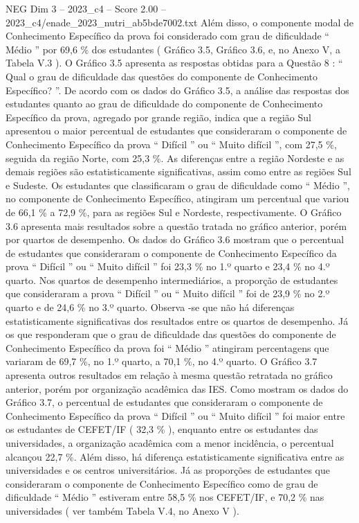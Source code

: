 \begin{textsample}{NEG Dim 3 – 2023\_c4 – Score 2.00 – 2023\_c4/enade\_2023\_nutri\_ab5bde7002.txt}
Além disso, o componente modal de Conhecimento Específico da prova foi considerado com grau de dificuldade “ Médio ” por 69,6 \% dos estudantes ( Gráfico 3.5, Gráfico 3.6, e, no Anexo V, a Tabela V.3 ).
O Gráfico 3.5 apresenta as respostas obtidas para a Questão 8 : “ Qual o grau de dificuldade das questões do componente de Conhecimento Específico? ”.
De acordo com os dados do Gráfico 3.5, a análise das respostas dos estudantes quanto ao grau de dificuldade do componente de Conhecimento Específico da prova, agregado por grande região, indica que a região Sul apresentou o maior percentual de estudantes que consideraram o componente de Conhecimento Específico da prova “ Difícil ” ou “ Muito difícil ”, com 27,5 \%, seguida da região Norte, com 25,3 \%.
As diferenças entre a região Nordeste e as demais regiões são estatisticamente significativas, assim como entre as regiões Sul e Sudeste.
Os estudantes que classificaram o grau de dificuldade como “ Médio ”, no componente de Conhecimento Específico, atingiram um percentual que variou de 66,1 \% a 72,9 \%, para as regiões Sul e Nordeste, respectivamente.
O Gráfico 3.6 apresenta mais resultados sobre a questão tratada no gráfico anterior, porém por quartos de desempenho.
Os dados do Gráfico 3.6 mostram que o percentual de estudantes que consideraram o componente de Conhecimento Específico da prova “ Difícil ” ou “ Muito difícil ” foi 23,3 \% no 1.º quarto e 23,4 \% no 4.º quarto.
Nos quartos de desempenho intermediários, a proporção de estudantes que consideraram a prova “ Difícil ” ou “ Muito difícil ” foi de 23,9 \% no 2.º quarto e de 24,6 \% no 3.º quarto.
Observa -se que não há diferenças estatisticamente significativas dos resultados entre os quartos de desempenho.
Já os que responderam que o grau de dificuldade das questões do componente de Conhecimento Específico da prova foi “ Médio ” atingiram percentagens que variaram de 69,7 \%, no 1.º quarto, a 70,1 \%, no 4.º quarto.
O Gráfico 3.7 apresenta outros resultados em relação à mesma questão retratada no gráfico anterior, porém por organização acadêmica das IES.
Como mostram os dados do Gráfico 3.7, o percentual de estudantes que consideraram o componente de Conhecimento Específico da prova “ Difícil ” ou “ Muito difícil ” foi maior entre os estudantes de CEFET/IF ( 32,3 \% ), enquanto entre os estudantes das universidades, a organização acadêmica com a menor incidência, o percentual alcançou 22,7 \%.
Além disso, há diferença estatisticamente significativa entre as universidades e os centros universitários.
Já as proporções de estudantes que consideraram o componente de Conhecimento Específico como de grau de dificuldade “ Médio ” estiveram entre 58,5 \% nos CEFET/IF, e 70,2 \% nas universidades ( ver também Tabela V.4, no Anexo V ).

\end{textsample}
